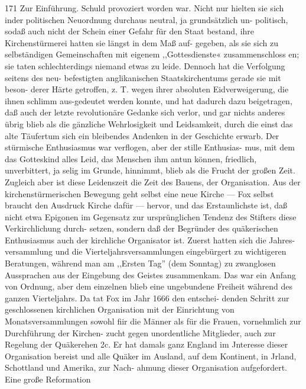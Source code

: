 171 Zur Einführung.
Schuld provoziert worden war. Nicht nur hielten sie sich inder
politischen Neuordnung durchaus neutral, ja grundsätzlich un-
politisch, sodaß auch nicht der Schein einer Gefahr für den Staat
bestand, ihre Kirchenstürmerei hatten sie längst in dem Maß auf-
gegeben, als sie sich zu selbständigen Gemeinschaften mit eigenem
,,Gottesdienste« zusammenschloss en; sie taten schlechterdings niemand
etwas zu leide. Dennoch hat die Verfolgung seitens des neu-
befestigten anglikanischen Staatskirchentums gerade sie mit beson-
derer Härte getroffen, z. T. wegen ihrer absoluten Eidverweigerung,
die ihnen schlimm aus-gedeutet werden konnte, und hat dadurch
dazu beigetragen, daß auch der letzte revolutionäre Gedanke sich
verlor, und gar nichts anderes übrig blieb als die gänzliche
Wehrlosigkeit und Leidsamkeit, durch die einst das alte Täufertum
sich ein bleibendes Andenken in der Geschichte erwarb. Der
stürmische Enthusiasmus war verflogen, aber der stille Enthusias-
mus, mit dem das Gotteskind alles Leid, das Menschen ihm
antun können, friedlich, unverbittert, ja selig im Grunde, hinnimmt,
blieb als die Frucht der großen Zeit. Zugleich aber ist diese
Leidenszeit die Zeit des Bauens, der Organisation. Aus der
kirchenstürmerischen Bewegung geht selbst eine neue Kirche — Fox
selbst braucht den Ausdruck Kirche dafür — hervor, und das
Erstaunlichste ist, daß nicht etwa Epigonen im Gegensatz zur
ursprünglichen Tendenz des Stifters diese Verkirchlichung durch-
setzen, sondern daß der Begründer des quäkerischen Enthusiasmus
auch der kirchliche Organisator ist. Zuerst hatten sich die Jahres-
versammlung und die Vierteljahrsversammlungen eingebürgert zu
wichtigeren Beratungen, während man am ,,Ersten Tag'' (dem
Sonntag) zu zwanglosen Aussprachen aus der Eingebung des
Geistes zusammenkam. Das war ein Anfang von Ordnung, aber
dem einzelnen blieb eine ungebundene Freiheit während des
ganzen Vierteljahrs. Da tat Fox im Jahr 1666 den entschei-
denden Schritt zur geschlossenen kirchlichen Organisation mit der
Einrichtung von Monatsversammlungen sowohl fiir die Männer
als für die Frauen, vornehmlich zur Durchführung der Kirchen-
zucht gegen unordentliche Mitglieder, auch zur Regelung der
Quäkerehen 2c. Er hat damals ganz England im Jnteresse
dieser Organisation bereist und alle Quäker im Ausland, auf
dem Kontinent, in Jrland, Schottland und Amerika, zur Nach-
ahmung dieser Organisation aufgefordert. Eine große Reformation


